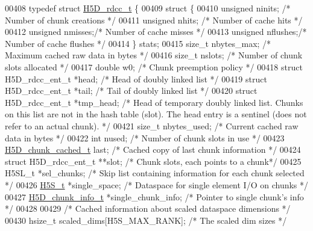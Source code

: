 \begin{DoxyCode}
00408 \textcolor{keyword}{typedef} \textcolor{keyword}{struct }\hyperlink{struct_h5_d__rdcc__t}{H5D\_rdcc\_t} \{
00409     \textcolor{keyword}{struct }\{
00410         \textcolor{keywordtype}{unsigned}    ninits; \textcolor{comment}{/* Number of chunk creations        */}
00411         \textcolor{keywordtype}{unsigned}    nhits;  \textcolor{comment}{/* Number of cache hits         */}
00412         \textcolor{keywordtype}{unsigned}    nmisses;\textcolor{comment}{/* Number of cache misses       */}
00413         \textcolor{keywordtype}{unsigned}    nflushes;\textcolor{comment}{/* Number of cache flushes     */}
00414     \} stats;
00415     \textcolor{keywordtype}{size\_t}      nbytes\_max; \textcolor{comment}{/* Maximum cached raw data in bytes */}
00416     \textcolor{keywordtype}{size\_t}      nslots; \textcolor{comment}{/* Number of chunk slots allocated  */}
00417     \textcolor{keywordtype}{double}      w0;     \textcolor{comment}{/* Chunk preemption policy          */}
00418     \textcolor{keyword}{struct }H5D\_rdcc\_ent\_t *head; \textcolor{comment}{/* Head of doubly linked list      */}
00419     \textcolor{keyword}{struct }H5D\_rdcc\_ent\_t *tail; \textcolor{comment}{/* Tail of doubly linked list      */}
00420     \textcolor{keyword}{struct }H5D\_rdcc\_ent\_t *tmp\_head; \textcolor{comment}{/* Head of temporary doubly linked list.  Chunks on this list are not
       in the hash table (slot).  The head entry is a sentinel (does not refer to an actual chunk). */}
00421     \textcolor{keywordtype}{size\_t}      nbytes\_used; \textcolor{comment}{/* Current cached raw data in bytes */}
00422     \textcolor{keywordtype}{int}         nused;  \textcolor{comment}{/* Number of chunk slots in use     */}
00423     \hyperlink{struct_h5_d__chunk__cached__t}{H5D\_chunk\_cached\_t} last;    \textcolor{comment}{/* Cached copy of last chunk information */}
00424     \textcolor{keyword}{struct }H5D\_rdcc\_ent\_t **slot; \textcolor{comment}{/* Chunk slots, each points to a chunk*/}
00425     H5SL\_t      *sel\_chunks; \textcolor{comment}{/* Skip list containing information for each chunk selected */}
00426     \hyperlink{struct_h5_s__t}{H5S\_t}      *single\_space; \textcolor{comment}{/* Dataspace for single element I/O on chunks */}
00427     \hyperlink{struct_h5_d__chunk__info__t}{H5D\_chunk\_info\_t}    *single\_chunk\_info;  \textcolor{comment}{/* Pointer to single chunk's info */}
00428 
00429     \textcolor{comment}{/* Cached information about scaled dataspace dimensions */}
00430     hsize\_t             scaled\_dims[H5S\_MAX\_RANK];          \textcolor{comment}{/* The scaled dim sizes */}

\end{DoxyCode}

